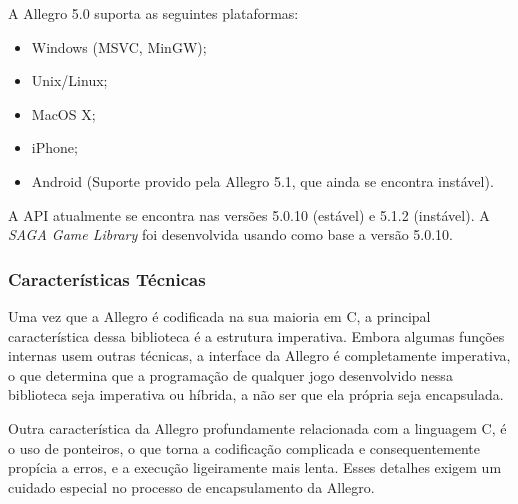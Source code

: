 \par
A Allegro 5.0 suporta as seguintes plataformas:
%
\begin{itemize}
 \item Windows (MSVC, MinGW);
 \item Unix/Linux;
 \item MacOS X;
 \item iPhone;
 \item Android (Suporte provido pela Allegro 5.1, que ainda se encontra instável).
\end{itemize}
%
A API atualmente se encontra nas versões 5.0.10 (estável) e 5.1.2 (instável). A \textit{SAGA Game Library} foi desenvolvida usando como base a versão 5.0.10.
%
\subsubsection{Características Técnicas}

Uma vez que a Allegro é codificada na sua maioria em C, a principal característica dessa biblioteca é a estrutura imperativa. Embora algumas funções internas usem outras técnicas, a interface da Allegro é completamente imperativa, o que determina que a programação de qualquer jogo desenvolvido nessa biblioteca seja imperativa ou híbrida, a não ser que ela própria seja encapsulada.
\par
Outra característica da Allegro profundamente relacionada com a linguagem C, é o uso de ponteiros, o que torna a codificação complicada e consequentemente propícia a erros, e a execução ligeiramente mais lenta. Esses detalhes exigem um cuidado especial no processo de encapsulamento da Allegro.
%
